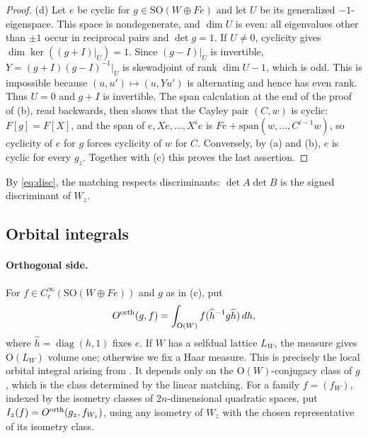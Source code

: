 \documentclass[11pt,oneside,notitlepage]{book}
\numberwithin{equation}{section}
\theoremstyle{plain}
\theoremstyle{definition}
\newcommand{\SO}{\mathrm{SO}}
\newcommand{\Ort}{\mathrm{O}}
\newcommand{\diag}{\operatorname{diag}}
\begin{document}
\begin{proof}
(d) Let $e$ be cyclic for $g\in\SO(W\oplus Fe)$ and let $U$ be its generalized $-1$-eigenspace. This space is nondegenerate, and $\dim U$ is even: all eigenvalues other than $\pm1$ occur in reciprocal pairs and $\det g=1$. If $U\ne0$, cyclicity gives $\dim\ker((g+I)|_U)=1$. Since $(g-I)|_U$ is invertible, $Y=(g+I)(g-I)^{-1}|_U$ is skewadjoint of rank $\dim U-1$, which is odd. This is impossible because $(u,u')\mapsto(u,Yu')$ is alternating and hence has even rank. Thus $U=0$ and $g+I$ is invertible. The span calculation at the end of the proof of (b), read backwards, then shows that the Cayley pair $(C,w)$ is cyclic: $F[g]=F[X]$, and the span of $e,Xe,\dots,X^ie$ is $Fe+\mathrm{span}(w,\dots,C^{i-1}w)$, so cyclicity of $e$ for $g$ forces cyclicity of $w$ for $C$. Conversely, by (a) and (b), $e$ is cyclic for every $g_z$. Together with (c) this proves the last assertion.
\end{proof}

By \eqref{eq:disc}, the matching respects discriminants: $\det A\det B$ is the signed discriminant of $W_z$.

\subsection*{Orbital integrals}

\paragraph{Orthogonal side.} For $f\in C_c^\infty(\SO(W\oplus Fe))$ and $g$ as in (c), put
\begin{equation}\label{eq:orthOI}
	O^{\rm orth}(g,f)=\int_{\Ort(W)}f(\widehat h^{-1}g\widehat h)\,dh,
\end{equation}
where $\widehat h=\diag(h,1)$ fixes $e$. If $W$ has a selfdual lattice $L_W$, the measure gives $\Ort(L_W)$ volume one; otherwise we fix a Haar measure. This is precisely the local orbital integral arising from . It depends only on the $\Ort(W)$-conjugacy class of $g$, which is the class determined by the linear matching. For a family $f=(f_W)$, indexed by the isometry classes of $2n$-dimensional quadratic spaces, put $I_z(f)=O^{\rm orth}(g_z,f_{W_z})$, using any isometry of $W_z$ with the chosen representative of its isometry class.
\end{document}
